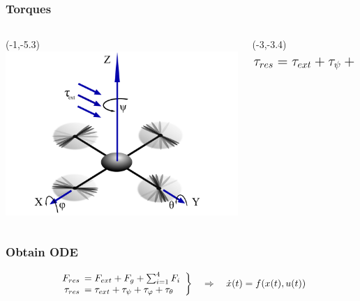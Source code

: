 \begin{frame}
		\frametitle{Torques}
			\begin{columns}[T] %
			\begin{column}{.7\textwidth}
				\begin{textblock}{0}(-1,-5.3)
					\includegraphics[width=11cm]{images/Copter_Text.pdf}
				\end{textblock}
			\end{column}
			\begin{column}{0.35\textwidth}
				\begin{textblock}{0}(-3,-3.4)
					\[ \mathlarger{\mathlarger{\tau_{res} = \tau_{ext}+\tau_{\psi}+\tau_{\varphi}+\tau_{\theta}}} \]
				\end{textblock}
				\end{column}
		\end{columns}
\end{frame}

\begin{frame}
	\frametitle{Obtain ODE}
	\begin{block}{}
		\centering
		\[\left. \begin{array}{rl} F_{res} \hspace{-1.25ex} &= F_{ext} + F_{g} + \sum_{i=1}^{4}{F_{i}} \\ \tau_{res} \hspace{-1.25ex} &= \tau_{ext} + \tau_{\psi} + \tau_{\varphi} + \tau_{\theta}  \end{array} \right\} \quad \Rightarrow \quad \dot{x}(t)=f(x(t),u(t)) \]
		\vspace{1ex}
	\end{block}
	
\end{frame}
